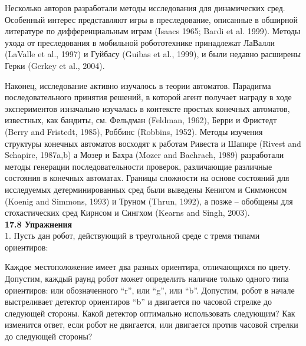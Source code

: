 \documentclass[10pt,a4paper]{article}
\begin{document}
Несколько авторов разработали методы исследования для динамических сред. Особенный интерес представляют игры в преследование, описанные в обширной литературе по дифференциальным играм (Isaacs 1965; Bardi et al. 1999). Методы ухода от преследования в мобильной робототехнике принадлежат ЛаВалли (LaValle et al., 1997) и Гуйбасу (Guibas et al., 1999), и были недавно расширены Герки (Gerkey et al., 2004).

Наконец, исследование активно изучалось в теории автоматов. Парадигма последовательного принятия решений, в которой агент получает награду в ходе экспериментов изначально изучалась в контексте простых конечных автоматов, известных, как бандиты, см. Фельдман (Feldman, 1962), Берри и Фристедт (Berry and Fristedt, 1985), Роббинс (Robbins, 1952). Методы изучения структуры конечных автоматов восходят к работам Ривеста и Шапире (Rivest and Schapire, 1987a,b) а Мозер и Бахра (Mozer and Bachrach, 1989) разработали методы генерации последовательности проверок, различающие различные состояния в конечных автоматах. Границы сложности на основе состояний для исследуемых детерминированных сред были выведены Кенигом и Симмонсом (Koenig and Simmons, 1993) и Труном (Thrun, 1992), а позже – обобщены для стохастических сред Кирнсом и Сингхом (Kearns and Singh, 2003).\\

\textbf{17.8	Упражнения}\\

1.	Пусть дан робот, действующий в треугольной среде с тремя типами ориентиров:

\begin{figure}[H]
	\label{fig:17treug}
\end{figure}

Каждое местоположение имеет два разных ориентира, отличающихся по цвету. Допустим, каждый раунд робот может определить наличие только одного типа ориентиров: или обозначенного “r”, или “g”, или “b”. Допустим, робот в начале выстреливает детектор ориентиров “b” и двигается по часовой стрелке до следующей стороны. Какой детектор оптимально использовать следующим? Как изменится ответ, если робот не двигается, или двигается против часовой стрелки до следующей стороны?\\
\end{document}
